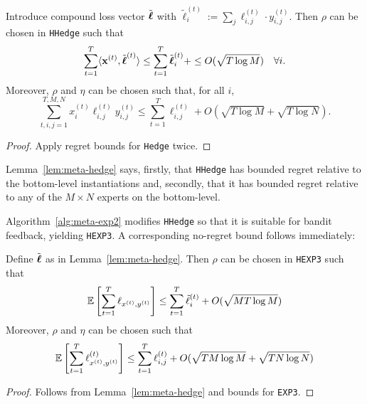 \begin{lem}\label{lem:meta-hedge}
	Introduce compound loss vector $\tilde{\boldsymbol\ell}$ with $\tilde{\ell}^{(t)}_i := \sum_j \ell^{(t)}_{i,j}\cdot y^{(t)}_{i,j}$. Then $\rho$ can be chosen in \texttt{HHedge} such that
	\begin{equation}
		\sum_{t=1}^T \langle {\mathbf x}^{(t)},\tilde{\boldsymbol\ell}^{(t)}\rangle 
		\leq  \sum_{t=1}^T \tilde{\boldsymbol\ell}^{(t)}_i +
		\leq O(\sqrt{T \log M})\quad\forall i.
	\end{equation}
	Moreover, $\rho$ and $\eta$ can be chosen such that, for all $i$,
	\begin{equation}
		\sum_{t,i,j=1}^{T,M,N} x^{(t)}_{i}\ell^{(t)}_{i,j} y^{(t)}_{i,j}
		\leq \sum_{t=1}^T\ell^{(t)}_{i,j}
		+ O(\sqrt{T \log M} + \sqrt{T \log N}).
	\end{equation}
\end{lem}

\begin{proof}
	Apply regret bounds for \texttt{Hedge} twice.
\end{proof}

Lemma~\ref{lem:meta-hedge} says, firstly, that \texttt{HHedge} has bounded regret relative to the bottom-level instantiations and, secondly, that it has bounded regret relative to any of the $M\times N$ experts on the bottom-level.


Algorithm~\ref{alg:meta-exp2} modifies \texttt{HHedge} so that it is suitable for bandit feedback, yielding \texttt{HEXP3}. A corresponding no-regret bound follows immediately:

\begin{lem}\label{lem:meta-exp}
	Define $\tilde{\boldsymbol\ell}$ as in Lemma~\ref{lem:meta-hedge}. Then $\rho$ can be chosen in \texttt{HEXP3} such that
	\begin{equation}
		\operatorname*{\mathbb E}\left[\sum_{t=1}^T\ell_{x^{(t)},y^{(t)}}\right]
		\leq \sum_{t=1}^T \tilde{\ell}^{(t)}_{i}
		+ O(\sqrt{MT\log M})
	\end{equation}
	Moreover, $\rho$ and $\eta$ can be chosen such that
	\begin{equation}
		\operatorname*{\mathbb E}\left[\sum_{t=1}^{T} \ell^{(t)}_{x^{(t)},y^{(t)}}\right]
		\leq \sum_{t=1}^T\ell^{(t)}_{i,j}
		+ O(\sqrt{TM \log M} + \sqrt{T N\log N})
	\end{equation}
\end{lem}
\begin{proof}
	Follows from Lemma~\ref{lem:meta-hedge} and bounds for \texttt{EXP3}.
\end{proof}

